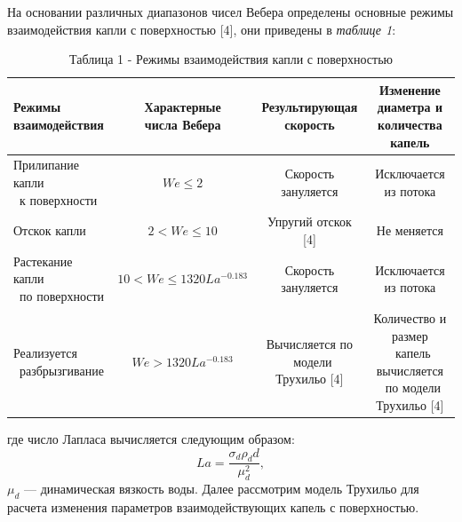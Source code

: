 На основании различных диапазонов чисел Вебера определены основные режимы взаимодействия капли с поверхностью [4], они приведены в \textit{таблице 1}:

\begin{table}[H]
    \caption*{Таблица 1 - Режимы взаимодействия капли с поверхностью}
    \small
	\centering
	\begin{tabular}{|l|c|c|c|}
		\hline
		\makecell{\textbf{Режимы}\\\textbf{взаимодействия}} &
		\makecell{\textbf{Характерные}\\\textbf{числа Вебера}} &
		\makecell{\textbf{Результирующая}\\\textbf{скорость}} &
		\makecell{\textbf{Изменение диаметра и}\\\textbf{количества капель}} \\
		\hline
		\makecell{Прилипание капли \\\ к поверхности} & $We \leq 2$ & Скорость зануляется & Исключается из потока \\
		\hline
		Отскок капли & $2 < We \leq 10$ & Упругий отскок [4] & Не меняется \\
		\hline
		\makecell{Растекание капли \\\ по поверхности} & $10 < We \leq 1320La^{-0.183}$ & Скорость зануляется & Исключается из потока \\
		\hline
		\makecell{Реализуется \\\ разбрызгивание} & $We > 1320La^{-0.183}$ & \makecell{Вычисляется по \\\ модели Трухильо [4]} & \makecell{Количество и размер \\\ капель вычисляется \\\ по модели Трухильо [4]} \\
		\hline
	\end{tabular}
\end{table}
где число Лапласа вычисляется следующим образом:
\begin{equation}
	La = \frac{\sigma_d \rho_d d}{\mu_d^2},
\end{equation}
$\mu_d$ --- динамическая вязкость воды. Далее рассмотрим модель Трухильо для расчета изменения параметров взаимодействующих капель с поверхностью.
